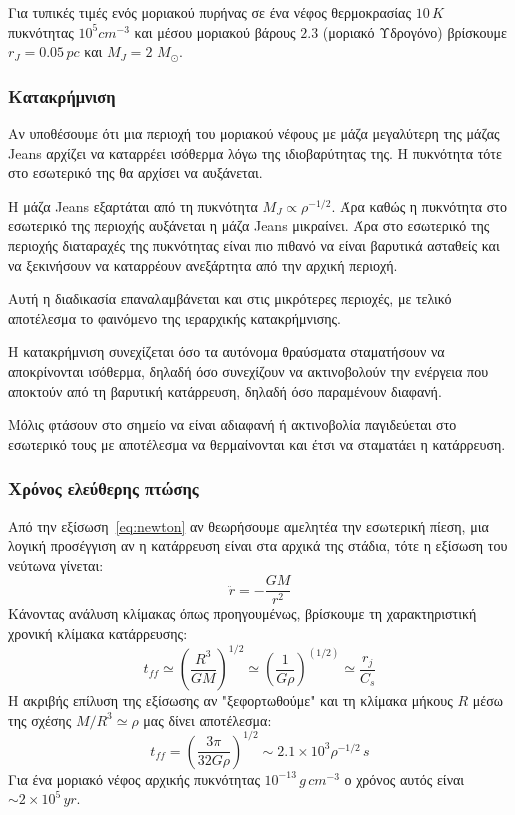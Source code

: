 \documentclass[a4paper,11pt]{memoir}
\newcommand{\sm}{$M_{\odot}$}
\begin{document}
Για τυπικές τιμές ενός μοριακού πυρήνας σε ένα νέφος θερμοκρασίας $10 \, K$ πυκνότητας $10^5 cm^{-3}$ και μέσου μοριακού βάρους $2.3$ (μοριακό Υδρογόνο) βρίσκουμε $r_J=0.05 \,pc$ και $M_J =2$ \sm.

\subsubsection{Κατακρήμνιση}
Αν υποθέσουμε ότι μια περιοχή του μοριακού νέφους με μάζα μεγαλύτερη της μάζας Jeans αρχίζει να καταρρέει ισόθερμα λόγω της ιδιοβαρύτητας της. Η πυκνότητα τότε στο εσωτερικό της θα αρχίσει να αυξάνεται. 

Η μάζα Jeans εξαρτάται από τη πυκνότητα $M_J \propto \rho ^{-1/2}$. Άρα καθώς η πυκνότητα στο εσωτερικό της περιοχής αυξάνεται η μάζα Jeans μικραίνει. Άρα στο εσωτερικό της περιοχής διαταραχές της πυκνότητας είναι πιο πιθανό να είναι βαρυτικά ασταθείς και να ξεκινήσουν να καταρρέουν ανεξάρτητα από την αρχική περιοχή.

Αυτή η διαδικασία επαναλαμβάνεται και στις μικρότερες περιοχές, με τελικό αποτέλεσμα το φαινόμενο της ιεραρχικής κατακρήμνισης.

Η κατακρήμνιση συνεχίζεται όσο τα αυτόνομα θραύσματα σταματήσουν να αποκρίνονται ισόθερμα, δηλαδή όσο συνεχίζουν να ακτινοβολούν την ενέργεια που αποκτούν από τη βαρυτική κατάρρευση, δηλαδή όσο παραμένουν διαφανή. 

Μόλις φτάσουν στο σημείο να είναι αδιαφανή ή ακτινοβολία παγιδεύεται στο εσωτερικό τους με αποτέλεσμα να θερμαίνονται και έτσι να σταματάει η κατάρρευση.

\subsubsection{Χρόνος ελεύθερης πτώσης}
Από την εξίσωση~\ref{eq:newton} αν θεωρήσουμε αμελητέα την εσωτερική πίεση, μια λογική προσέγγιση αν η κατάρρευση είναι στα αρχικά της στάδια, τότε η εξίσωση του νεύτωνα γίνεται:
\begin{equation}
\ddot{r}=-\frac{GM}{r^2}
\end{equation}
Κάνοντας ανάλυση κλίμακας όπως προηγουμένως, βρίσκουμε τη χαρακτηριστική χρονική κλίμακα κατάρρευσης:
\begin{equation}
t_{ff}\simeq \left(\frac{R^3}{GM}\right)^{1/2} \simeq \left( \frac{1}{G \rho}\right) ^(1/2) \simeq \frac{r_j}{C_s} 
\end{equation}
Η ακριβής επίλυση της εξίσωσης αν "ξεφορτωθούμε" και τη κλίμακα μήκους $R$ μέσω της σχέσης $M/R^3 \simeq \rho$ μας δίνει αποτέλεσμα:
\begin{equation}
t_{ff}=\left( \frac{3 \pi}{32 G \rho}\right) ^{1/2} \sim 2.1\times 10^3 \rho ^{-1/2} \, s
\end{equation}
Για ένα μοριακό νέφος αρχικής πυκνότητας $10^{-13}\, g\,cm^{-3}$ ο χρόνος αυτός είναι $\sim 2\times 10^5 \, yr$. 
\end{document}
